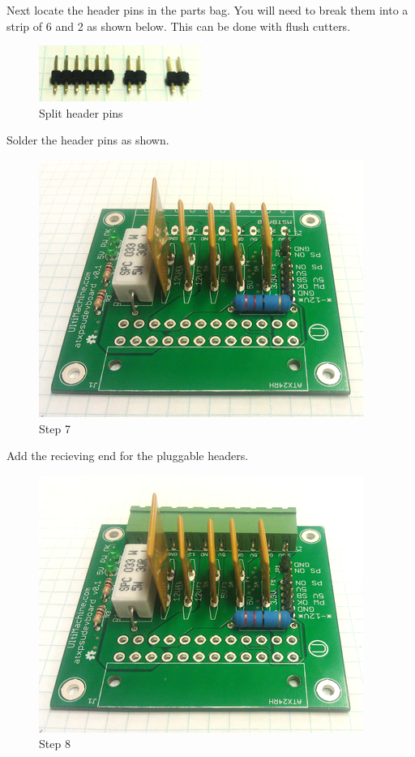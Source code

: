Next locate the header pins in the parts bag. You will need to break
them into a strip of 6 and 2 as shown below. This can be done with flush
cutters.

\begin{figure}[htbp]
\centering
\includegraphics{./png/header-break.png}
\caption{Split header pins}
\end{figure}

Solder the header pins as shown.

\begin{figure}[htbp]
\centering
\includegraphics{./png/step-07.png}
\caption{Step 7}
\end{figure}

Add the recieving end for the pluggable headers.

\begin{figure}[htbp]
\centering
\includegraphics{./png/step-08.png}
\caption{Step 8}
\end{figure}

